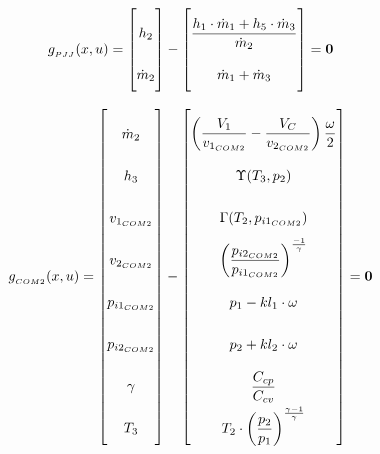 \begin{equation} \label{eq:Gpjj}\renewcommand{\arraystretch}{2.5}
	g_{_{PJJ}}(x,u) =  \begin{bmatrix}
		h_{2}				\\ %
		\dot{m}_{2}			\\ %
	\end{bmatrix}
	-
	\begin{bmatrix}
		\dfrac{h_{1} \cdot \dot{m}_{1} + h_{5} \cdot \dot{m}_{3}}{ \dot{m}_{2} } \\ 	%
		\dot{m}_{1} + \dot{m}_{3} \\													%
	\end{bmatrix}
	=\textbf{0}
\end{equation}


\begin{equation} \label{eq:Gcs2}\renewcommand{\arraystretch}{2.5}
	g_{_{COM2}}(x,u) =  \begin{bmatrix}
		\dot{m}_2  		 	\\ %
		h_{3}				\\ %
		v_{1_{COM2}}			\\ %
		v_{2_{COM2}}			\\ %
		p_{i1_{COM2}}		\\ %
		p_{i2_{COM2}}		\\ %
		\gamma				\\ %
		T_{3}				\\ %
	\end{bmatrix}
	-
	\begin{bmatrix}
		\left(\dfrac{V_1}{v_{1_{COM2}}} - \dfrac{V_C}{v_{2_{COM2}}}\right) \dfrac{\omega}{2} \\			%
		\Upsilon(T_{3}, p_{2})		\\													%
		\Gamma(T_{2},p_{i1_{COM2}}) \\													%
		\left(\dfrac{p_{i2_{COM2}}}{p_{i1_{COM2}}}\right)^{\frac{-1}{\gamma}} \\		%
		p_{1} - kl_1 \cdot \omega \\													%
		p_{2} + kl_2 \cdot \omega \\													%
		\dfrac{C_{cp}}{C_{cv}} \\														%
		T_{2}\cdot \left(\dfrac{p_{2}}{p_{1}}\right)^{\frac{\gamma-1}{\gamma}}	\\		%
	\end{bmatrix}
	=\textbf{0}
\end{equation}


